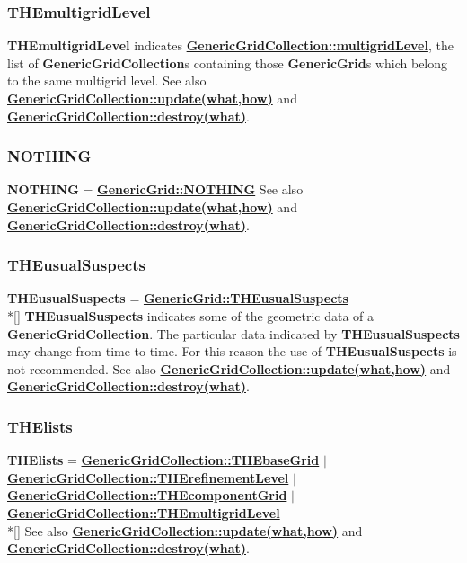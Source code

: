 \documentclass{article}
\begin{document}
  \subsubsection{THEmultigridLevel}
  \label{GenericGridCollection::THEmultigridLevel}
    \textbf{THEmultigridLevel} indicates {\bf{}\hyperref{multigridLevel}{multigridLevel \rm(\S}{)}{GenericGridCollection::multigridLevel}},
    the list of \textbf{GenericGridCollection}s containing those \textbf{GenericGrid}s which belong to the same multigrid level.
    See also {\bf{}\hyperref{update(what,how)}{update(what,how) \rm(\S}{)}{GenericGridCollection::update(what,how)}}
    and {\bf{}\hyperref{destroy(what)}{destroy(what) \rm(\S}{)}{GenericGridCollection::destroy(what)}}.

  \subsubsection{NOTHING}
  \label{GenericGridCollection::NOTHING}
    \textbf{NOTHING} = {\bf{}\hyperref{GenericGrid::NOTHING}{GenericGrid::NOTHING \rm(\S}{)}{GenericGrid::NOTHING}}
    See also {\bf{}\hyperref{update(what,how)}{update(what,how) \rm(\S}{)}{GenericGridCollection::update(what,how)}}
    and {\bf{}\hyperref{destroy(what)}{destroy(what) \rm(\S}{)}{GenericGridCollection::destroy(what)}}.

  \subsubsection{THEusualSuspects}
  \label{GenericGridCollection::THEusualSuspects}
    \textbf{THEusualSuspects} =
    {\bf{}\hyperref{GenericGrid::THEusualSuspects}{GenericGrid::THEusualSuspects \rm(\S}{)}{GenericGrid::THEusualSuspects}} \\*[\parskip]
    \textbf{THEusualSuspects} indicates some of the geometric data of a \textbf{GenericGridCollection}.
    The particular data indicated by \textbf{THEusualSuspects} may change from time to time.
    For this reason the use of \textbf{THEusualSuspects} is not recommended.
    See also {\bf{}\hyperref{update(what,how)}{update(what,how) \rm(\S}{)}{GenericGridCollection::update(what,how)}}
    and {\bf{}\hyperref{destroy(what)}{destroy(what) \rm(\S}{)}{GenericGridCollection::destroy(what)}}.

  \subsubsection{THElists}
  \label{GenericGridCollection::THElists}
    \textbf{THElists}
    =      {\bf{}\hyperref{THEbaseGrid}{THEbaseGrid \rm(\S}{)}{GenericGridCollection::THEbaseGrid}}
    $\mid$ {\bf{}\hyperref{THErefinementLevel}{THErefinementLevel \rm(\S}{)}{GenericGridCollection::THErefinementLevel}}
    $\mid$ {\bf{}\hyperref{THEcomponentGrid}{THEcomponentGrid \rm(\S}{)}{GenericGridCollection::THEcomponentGrid}}
    $\mid$ {\bf{}\hyperref{THEmultigridLevel}{THEmultigridLevel \rm(\S}{)}{GenericGridCollection::THEmultigridLevel}} \\*[\parskip]
    See also {\bf{}\hyperref{update(what,how)}{update(what,how) \rm(\S}{)}{GenericGridCollection::update(what,how)}}
    and {\bf{}\hyperref{destroy(what)}{destroy(what) \rm(\S}{)}{GenericGridCollection::destroy(what)}}.
\end{document}
